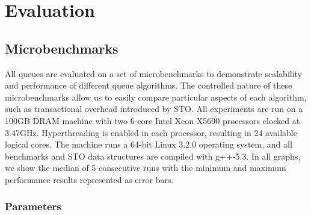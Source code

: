 \section{Evaluation}

\subsection{Microbenchmarks}
\label{microbenchmarks}

All queues are evaluated on a set of microbenchmarks to demonstrate scalability and performance of different queue algorithms. The controlled nature of these microbenchmarks allow us to easily compare particular aspects of each algorithm, such as transactional overhead introduced by STO. All experiments are run on a 100GB DRAM machine with two 6-core Intel Xeon X5690 processors clocked at 3.47GHz. Hyperthreading is enabled in each processor, resulting in 24 available logical cores. The machine runs a 64-bit Linux 3.2.0 operating system, and all benchmarks and STO data structures are compiled with g++-5.3. In all graphs, we show the median of 5 consecutive runs with the minimum and maximum performance results represented as error bars.

\subsubsection{Parameters}

